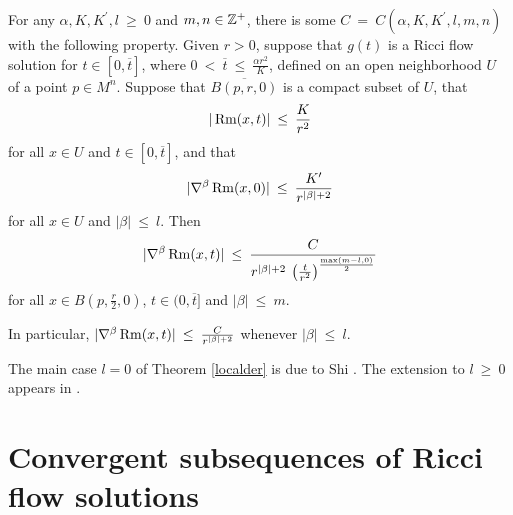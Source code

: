 \begin{theorem}
  \label{thm:kl-local-derivative-estimates-existence-local-derivative-estimates}
 \label{localder}
For any $\alpha, K, K^\prime, l \: \ge \: 0$ and $m, n \in {\mathbb Z}^+$,
there is some $C \: = \: C(\alpha, K, K^\prime, l,m, n)$ with the
following property.
Given $r > 0$,
suppose that $g(t)$ is a Ricci flow solution
for $t \in [0, \overline{t}]$, where $0 \: < \:
\overline{t} \: \le \:
\frac{\alpha r^2}{K}$, defined on an open neighborhood $U$ of a point
$p \in M^n$. Suppose that $\overline{B(p, r, 0)}$ is a compact
subset of $U$, that
\begin{equation}
|\operatorname{Rm}(x, t)| \: \le \: \frac{K}{r^{2}}
\end{equation}
for all $x \in U$ and $t \in [0, \overline{t}]$, and that
\begin{equation}
|\nabla^\beta \operatorname{Rm}(x, 0)| \: \le \: \frac{K^\prime}{r^{|\beta|+2}}
\end{equation}
for all $x \in U$ and $|\beta| \: \le \: l$.
Then
\begin{equation}
|\nabla^\beta \operatorname{Rm}(x, t)| \: \le \:
\frac{C}{
r^{|\beta|+2} \: \left( \frac{t}{r^2} \right)^{\frac{\max(m-l,0)}{2}}
}
\end{equation}
for all $x \in B \left(p, \frac{r}{2}, 0 \right)$,
$t \in (0, \overline{t}]$ and $|\beta| \: \le \: m$.

In particular,
$|\nabla^\beta \operatorname{Rm}(x, t)| \: \le \:
\frac{C}{r^{|\beta|+2}}$ whenever
$|\beta| \: \le \: l$.
\end{theorem}

The main case $l = 0$ of Theorem \ref{localder} is due to Shi
\cite{Shi2 (1989)}. The extension to $l \: \ge \: 0$ appears in
\cite[Appendix B]{Lu-Tian}.

\section{Convergent subsequences of Ricci flow solutions}
\label{subsequence}

